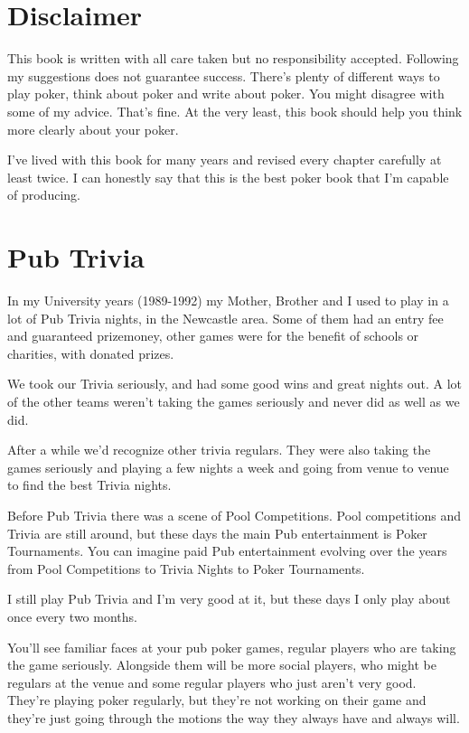 \section*{Disclaimer}

This book is written with all care taken but no responsibility accepted.
Following my suggestions does not guarantee success.
There's plenty of different ways to play poker, think about poker
and write about poker. You might disagree with some of my advice.
That's fine. At the very least, this book should help you think
more clearly about your poker.

I've lived with this book for many years and revised every chapter
carefully at least twice. I can honestly say that this is the best
poker book that I'm capable of producing.

\section*{Pub Trivia}

In my University years (1989-1992) my Mother, Brother and I used to
play in a lot of Pub Trivia nights, in the Newcastle area. Some of them
had an entry fee and guaranteed prizemoney, other games were for the
benefit of schools or charities, with donated prizes.

We took our Trivia seriously, and had some good wins and
great nights out. A lot of the other teams weren't taking the games
seriously and never did as well as we did.

After a while we'd recognize other trivia regulars. They were also taking
the games seriously and playing a few nights a week and going from venue
to venue to find the best Trivia nights.

Before Pub Trivia there was a scene of Pool Competitions. Pool competitions
and Trivia are still around, but these days the main Pub entertainment
is Poker Tournaments. You can imagine paid Pub entertainment evolving
over the years from Pool Competitions to Trivia Nights to Poker Tournaments.

I still play Pub Trivia and I'm very good at it, but these days
I only play about once every two months.

You'll see familiar faces at your pub poker games,
regular players who are taking the game seriously. Alongside them
will be more social players, who might be regulars at the venue
and some regular players who just aren't very good. They're playing
poker regularly, but they're not working on their game and they're
just going through the motions the way they always have and always
will.

